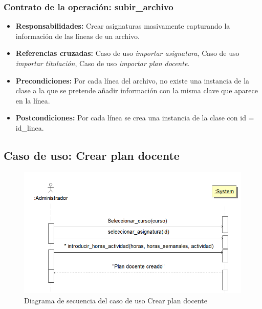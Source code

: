 \documentclass{book}
\begin{document}
\subsubsection{Contrato de la operación: subir\_archivo}
\begin{itemize}
\item {\bf Responsabilidades:} Crear asignaturas masivamente capturando la información de las líneas de un archivo.
\item {\bf Referencias cruzadas:} Caso de uso {\em importar asignatura}, Caso de uso {\em importar titulación}, Caso de uso {\em importar plan docente}.
\item {\bf Precondiciones:} Por cada línea del archivo, no existe una instancia de la clase a la que se pretende añadir información con la misma clave que aparece en la línea.
\item {\bf Postcondiciones:} Por cada línea se crea una instancia de la clase con id = id\_linea.
\end{itemize}

\subsection{Caso de uso: Crear plan docente}
\begin{figure}[H] 
  \label{comportamiento-crear-plandocente} 
	\begin{center}
    \includegraphics[scale=0.5]{./secuencia-crear-plandocente.png}
  \end{center}
\caption{Diagrama de secuencia del caso de uso Crear plan docente}
\end{figure}
\end{document}
